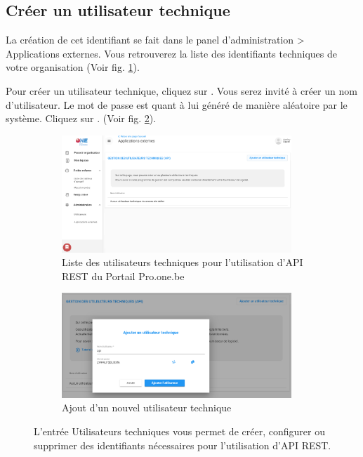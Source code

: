 \subsection{Créer un utilisateur technique}
La création de cet identifiant se fait dans le panel d'administration > Applications externes. Vous retrouverez la liste des identifiants techniques de votre organisation (Voir fig. \ref{subfig:create_user}).

Pour créer un utilisateur technique, cliquez sur . Vous serez invité à créer un nom d'utilisateur. Le mot de passe est quant à lui généré de manière aléatoire par le système. Cliquez sur . (Voir fig. \ref{subfig:add_user}). 



\begin{figure}[!h]
    \centering
    \begin{subfigure}[t]{0.48\textwidth}
         \centering
         \includegraphics[width=0.95\textwidth, frame]{Images/api/create_user.png}
         \caption{Liste des utilisateurs techniques pour l'utilisation d'API REST du Portail Pro.one.be}
         \label{subfig:create_user}
     \end{subfigure}
    \begin{subfigure}[t]{0.48\textwidth}
         \centering
         \includegraphics[width=0.95\textwidth, frame]{Images/api/add_user.png}
         \caption{Ajout d'un nouvel utilisateur technique}
         \label{subfig:add_user}
     \end{subfigure}

    
    \caption{L'entrée Utilisateurs techniques vous permet de créer, configurer ou supprimer des identifiants nécessaires pour l'utilisation d'API REST.}
    \label{fig:user_technique}
    
\end{figure}

